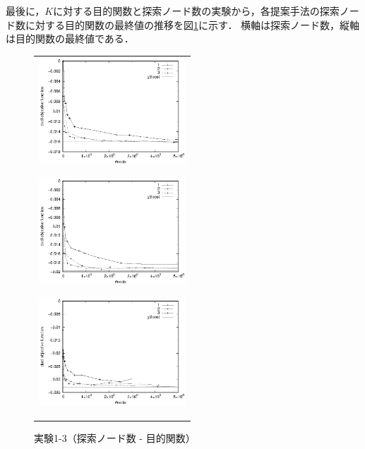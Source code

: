 最後に，$K$に対する目的関数と探索ノード数の実験から，各提案手法の探索ノード数に対する目的関数の最終値の推移を図\ref{1-3}に示す．
横軸は探索ノード数，縦軸は目的関数の最終値である．
\begin{figure}[t]
	\begin{center}
		\begin{tabular}{c}
			\begin{minipage}{0.33\hsize}
				\begin{center}
					\includegraphics[width=55mm]{cpdb/purpose_node_1.eps}
				\end{center}
				\vspace{0.5cm}
				\subcaption{$\nu = 0.1$}
				\label{fig:7}
			\end{minipage}
			\begin{minipage}{0.33\hsize}
				\begin{center}
					\includegraphics[width=55mm]{cpdb/purpose_node_3.eps}
				\end{center}
				\vspace{0.5cm}
				\subcaption{$\nu = 0.3$}
				\label{fig:8}
			\end{minipage}
			\begin{minipage}{0.33\hsize}
				\begin{center}
					\includegraphics[width=55mm]{cpdb/purpose_node_5.eps}
				\end{center}
				\vspace{0.5cm}
				\subcaption{$\nu = 0.5$}
				\label{fig:9}
			\end{minipage}
		\end{tabular}
		\caption{実験1-3（探索ノード数 - 目的関数）}
		\label{1-3}
	\end{center}
\end{figure}

